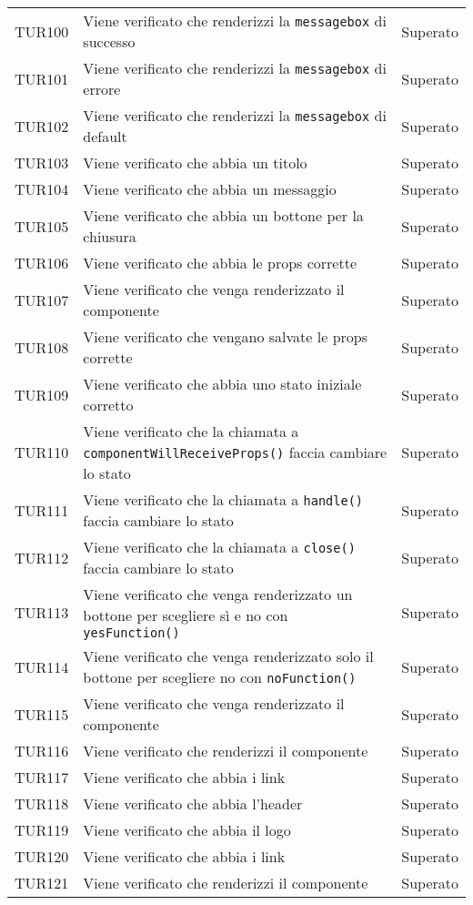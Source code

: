 \documentclass[PianoDiQualifica.tex]{subfiles}
\begin{document}
\begin{longtable}[H]{P{2cm}P{8.5cm}P{3cm}}
	TUR100 & Viene verificato che renderizzi la \texttt{messagebox} di successo & Superato \\ 
	TUR101 & Viene verificato che renderizzi la \texttt{messagebox} di errore & Superato \\ 
	TUR102 & Viene verificato che renderizzi la \texttt{messagebox} di default & Superato \\ 
	TUR103 & Viene verificato che abbia un titolo & Superato \\ 
	TUR104 & Viene verificato che abbia un messaggio & Superato \\ 
	TUR105 & Viene verificato che abbia un bottone per la chiusura & Superato \\ 
	TUR106 & Viene verificato che abbia le props corrette & Superato \\ 
	TUR107 & Viene verificato che venga renderizzato il componente & Superato \\ 
	TUR108 & Viene verificato che vengano salvate le props corrette & Superato \\ 
	TUR109 & Viene verificato che abbia uno stato iniziale corretto & Superato \\ 
	TUR110 & Viene verificato che la chiamata a \texttt{componentWillReceiveProps()} faccia cambiare lo stato & Superato \\ 
	TUR111 & Viene verificato che la chiamata a \texttt{handle()} faccia cambiare lo stato & Superato \\ 
	TUR112 & Viene verificato che la chiamata a \texttt{close()} faccia cambiare lo stato & Superato \\ 
	TUR113 & Viene verificato che venga renderizzato un bottone per scegliere sì e no con \texttt{yesFunction()} & Superato \\ 
	TUR114 & Viene verificato che venga renderizzato solo il bottone per scegliere no con \texttt{noFunction()} & Superato \\ 
	TUR115 & Viene verificato che venga renderizzato il componente & Superato \\ 
	TUR116 & Viene verificato che renderizzi il componente & Superato \\ 
	TUR117 & Viene verificato che abbia i link & Superato \\ 
	TUR118 & Viene verificato che abbia l'header & Superato \\ 
	TUR119 & Viene verificato che abbia il logo & Superato \\ 
	TUR120 & Viene verificato che abbia i link& Superato \\ 
	TUR121 & Viene verificato che renderizzi il componente & Superato \\ 

\end{longtable}
\end{document}
